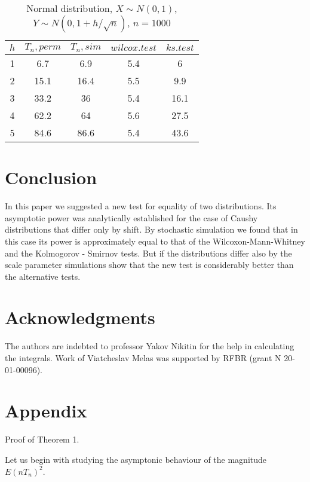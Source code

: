 \documentclass{svproc}
\begin{document}
\begin{table}
  \caption{Normal distribution, $X\sim N(0,1)$, $Y\sim N(0, 1 + h/\sqrt{n})$, $n=1000$}
  \begin{center}
  \begin{tabular}{c@{\quad}c@{\quad}c@{\quad}c@{\quad}c}
  \hline
  $h$ & $T_n, perm$ & $T_n, sim$ & $wilcox.test$ & $ks.test$ \\
  \hline
  1 & 6.7 & 6.9 & 5.4 & 6 \\
  2 & 15.1 & 16.4 & 5.5 & 9.9 \\
  3 & 33.2 & 36 & 5.4 & 16.1 \\
  4 & 62.2 & 64 & 5.6 & 27.5 \\
  5 & 84.6 & 86.6 & 5.4 & 43.6 \\
  \hline
  \end{tabular}
  \end{center}
\end{table}

\section{Conclusion}
In this paper we suggested a new test for equality of two distributions. Its asymptotic power was analytically established for the case of Caushy distributions that differ only by shift. By stochastic simulation we found that in this case its power is approximately equal to that of the Wilcoxon-Mann-Whitney and the
Kolmogorov - Smirnov tests. But if the distributions differ also by the scale parameter simulations show that the new test is considerably better than the alternative tests.

\section*{Acknowledgments}
The authors are indebted to professor
 Yakov Nikitin for the help in calculating the  integrals. Work of Viatcheslav Melas was supported by RFBR (grant N 20-01-00096).

\section{Appendix}
Proof of Theorem 1.

Let us begin with studying the asymptonic behaviour of the magnitude $E(nT_n)^2$.
\end{document}
